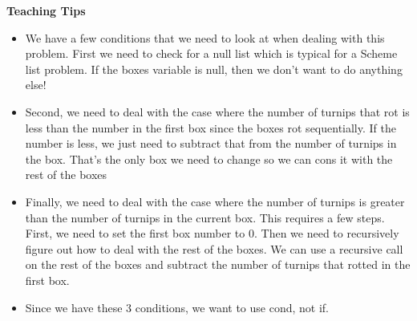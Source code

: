 \begin{blocksection}
\begin{guide}
\textbf{Teaching Tips}
\begin{itemize}
  \item We have a few conditions that we need to look at when dealing with this problem. First we need to check for a null list which is typical for a Scheme list problem. If the boxes variable is null, then we don’t want to do anything else! 
  \item Second, we need to deal with the case where the number of turnips that rot is less than the number in the first box since the boxes rot sequentially. If the number is less, we just need to subtract that from the number of turnips in the box. That’s the only box we need to change so we can cons it with the rest of the boxes 
  \item Finally, we need to deal with the case where the number of turnips is greater than the number of turnips in the current box. This requires a few steps. First, we need to set the first box number to 0. Then we need to recursively figure out how to deal with the rest of the boxes. We can use a recursive call on the rest of the boxes and subtract the number of turnips that rotted in the first box. 
  \item Since we have these 3 conditions, we want to use cond, not if. 
\end{itemize}
\end{guide}
\end{blocksection}